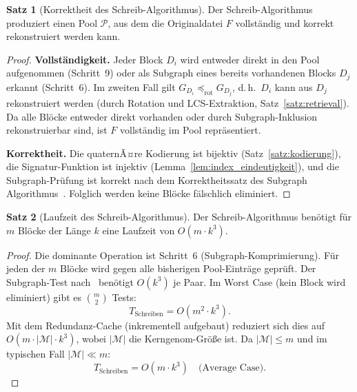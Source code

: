 ﻿\documentclass[a4paper,12pt]{article}
\theoremstyle{definition}
\newtheorem{satz}{Satz}
\begin{document}
\begin{satz}[Korrektheit des Schreib-Algorithmus]
    \label{satz:schreib_korrekt}
    Der Schreib-Algorithmus produziert einen Pool $\mathcal{P}$, aus dem
    die Originaldatei $F$ vollst\"{a}ndig und korrekt rekonstruiert werden kann.
\end{satz}

\begin{proof}
    \textbf{Vollst\"{a}ndigkeit.}
    Jeder Block $D_i$ wird entweder direkt in den Pool aufgenommen
    (Schritt~9) oder als Subgraph eines bereits vorhandenen Blocks $D_j$
    erkannt (Schritt~6). Im zweiten Fall gilt $G_{D_i} \preceq_{\mathrm{rot}}
    G_{D_j}$, d.\,h.\ $D_i$ kann aus $D_j$ rekonstruiert werden
    (durch Rotation und LCS-Extraktion, Satz~\ref{satz:retrieval}).
    Da alle Bl\"{o}cke entweder direkt vorhanden oder durch Subgraph-Inklusion
    rekonstruierbar sind, ist $F$ vollst\"{a}ndig im Pool repr\"{a}sentiert.

    \textbf{Korrektheit.}
    Die quaternÃ¤re Kodierung ist bijektiv (Satz~\ref{satz:kodierung}),
    die Signatur-Funktion ist injektiv (Lemma~\ref{lem:index_eindeutigkeit}),
    und die Subgraph-Pr\"{u}fung ist korrekt nach dem Korrektheitssatz
    des Subgraph Algorithmus~\cite{epp2026}.
    Folglich werden keine Bl\"{o}cke f\"{a}lschlich eliminiert. 
\end{proof}

\begin{satz}[Laufzeit des Schreib-Algorithmus]
    \label{satz:schreib_laufzeit}
    Der Schreib-Algorithmus ben\"{o}tigt f\"{u}r $m$ Bl\"{o}cke
    der L\"{a}nge $k$ eine Laufzeit von $O(m \cdot k^3)$.
\end{satz}

\begin{proof}
    Die dominante Operation ist Schritt~6 (Subgraph-Komprimierung).
    F\"{u}r jeden der $m$ Bl\"{o}cke wird gegen alle bisherigen
    Pool-Eintr\"{a}ge gepr\"{u}ft. Der Subgraph-Test nach~\cite{epp2026}
    ben\"{o}tigt $O(k^3)$ je Paar. Im Worst Case (kein Block wird eliminiert)
    gibt es $\binom{m}{2}$ Tests:
    \[
        T_{\text{Schreiben}} = O(m^2 \cdot k^3).
    \]
    Mit dem Redundanz-Cache (inkrementell aufgebaut) reduziert sich
    dies auf $O(m \cdot |\mathcal{M}| \cdot k^3)$, wobei
    $|\mathcal{M}|$ die Kerngenom-Gr\"{o}\ss{}e ist.
    Da $|\mathcal{M}| \le m$ und im typischen Fall $|\mathcal{M}| \ll m$:
    \[
        T_{\text{Schreiben}} = O(m \cdot k^3)
        \quad \text{(Average Case)}.
    \]
\end{proof}
\end{document}

